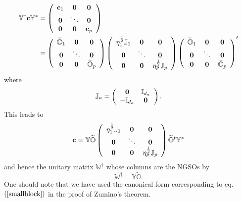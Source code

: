\documentclass[preprint,aps,showkeys]{revtex4}%
\begin{document}
\begin{align}
\mathbb{Y}^{\dagger}\mathbf{c}\mathbb{Y}^{\ast}  &  =\left(
\begin{array}
[c]{ccc}%
\mathbf{c}_{1} & \mathbf{0} & \mathbf{0}\\
\mathbf{0} & \ddots & \mathbf{0}\\
\mathbf{0} & \mathbf{0} & \mathbf{c}_{p}%
\end{array}
\right) \nonumber\\
&  =\left(
\begin{array}
[c]{ccc}%
\widetilde{\mathbb{O}}_{1} & \mathbf{0} & \mathbf{0}\\
\mathbf{0} & \ddots & \mathbf{0}\\
\mathbf{0} & \mathbf{0} & \widetilde{\mathbb{O}}_{p}%
\end{array}
\right)  \left(
\begin{array}
[c]{ccc}%
\eta_{1}^{\frac{1}{2}}\mathbb{J}_{1} & \mathbf{0} & \mathbf{0}\\
\mathbf{0} & \ddots & \mathbf{0}\\
\mathbf{0} & \mathbf{0} & \eta_{p}^{\frac{1}{2}}\mathbb{J}_{p}%
\end{array}
\right)  \left(
\begin{array}
[c]{ccc}%
\widetilde{\mathbb{O}}_{1} & \mathbf{0} & \mathbf{0}\\
\mathbf{0} & \ddots & \mathbf{0}\\
\mathbf{0} & \mathbf{0} & \widetilde{\mathbb{O}}_{p}%
\end{array}
\right)  ^{t}%
\end{align}
where
\begin{equation}
\mathbb{J}_{\kappa}=\left(
\begin{array}
[c]{cc}%
\mathbf{0} & \mathbb{I}_{d_{\kappa}}\\
-\mathbb{I}_{d_{\kappa}} & \mathbf{0}%
\end{array}
\right)  .
\end{equation}
This leads to
\begin{equation}
\mathbf{c}=\mathbb{Y}\widetilde{\mathbb{O}}\left(
\begin{array}
[c]{ccc}%
\eta_{1}^{\frac{1}{2}}\mathbb{J}_{1} & \mathbf{0} & \mathbf{0}\\
\mathbf{0} & \ddots & \mathbf{0}\\
\mathbf{0} & \mathbf{0} & \eta_{p}^{\frac{1}{2}}\mathbb{J}_{p}%
\end{array}
\right)  \widetilde{\mathbb{O}}^{t}\mathbb{Y}^{\ast}%
\end{equation}
and hence the unitary matrix $\mathbb{W}^{\dagger}$ whose columns are the
NGSOs by
\begin{equation}
\mathbb{W}^{\dagger}=\mathbb{Y}\widetilde{\mathbb{O}}.
\end{equation}
One should note that we have used the canonical form corresponding to eq.
$\left(  \ref{smallblock}\right)  $ in the proof of Zumino's theorem.
\end{document}
